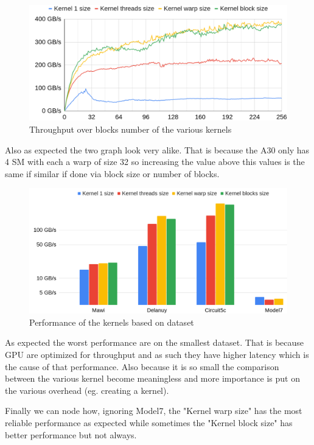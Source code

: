 \documentclass[conference]{IEEEtran}
\begin{document}
\begin{figure}[hbt!]
	\centering
	\includegraphics[width=1\linewidth]{data_images/Gb_for_size_grid}
	\caption{Throughput over blocks number of the various kernels}
	\label{fig:gbforsizegrid}
\end{figure}

Also as expected the two graph look very alike. That is because the A30 only has 4 SM with each a warp of size 32 so increasing the value above this values is the same if similar if done via block size or number of blocks.


\begin{figure}
	\centering
	\includegraphics[width=0.9\linewidth]{data_images/perf_gpu}
	\caption{Performance of the kernels based on dataset}
	\label{fig:perf-gpu}
\end{figure}
\FloatBarrier
As expected the worst performance are on the smallest dataset. That is because GPU are optimized for throughput and as such they have higher latency which is the cause of that performance. Also because it is so small the comparison between the various kernel become meaningless and more importance is put on the various overhead (eg. creating a kernel).

Finally we can node how, ignoring Model7, the "Kernel warp size" has the most reliable performance as expected while sometimes the "Kernel block size" has better performance but not always.
\end{document}
